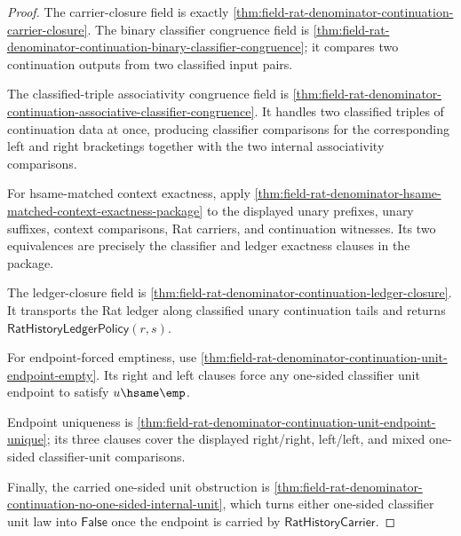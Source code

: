 \begin{proof}
The carrier-closure field is exactly
\autoref{thm:field-rat-denominator-continuation-carrier-closure}. The binary
classifier congruence field is
\autoref{thm:field-rat-denominator-continuation-binary-classifier-congruence};
it compares two continuation outputs from two classified input pairs.

The classified-triple associativity congruence field is
\autoref{thm:field-rat-denominator-continuation-associative-classifier-congruence}.
It handles two classified triples of continuation data at once, producing
classifier comparisons for the corresponding left and right bracketings together
with the two internal associativity comparisons.

For hsame-matched context exactness, apply
\autoref{thm:field-rat-denominator-hsame-matched-context-exactness-package} to
the displayed unary prefixes, unary suffixes, context comparisons, Rat carriers,
and continuation witnesses. Its two equivalences are precisely the classifier
and ledger exactness clauses in the package.

The ledger-closure field is
\autoref{thm:field-rat-denominator-continuation-ledger-closure}. It transports
the Rat ledger along classified unary continuation tails and returns
$\mathsf{RatHistoryLedgerPolicy}(r,s)$.

For endpoint-forced emptiness, use
\autoref{thm:field-rat-denominator-continuation-unit-endpoint-empty}. Its right
and left clauses force any one-sided classifier unit endpoint to satisfy
$u\hsame\emp$.

Endpoint uniqueness is
\autoref{thm:field-rat-denominator-continuation-unit-endpoint-unique}; its three
clauses cover the displayed right/right, left/left, and mixed one-sided
classifier-unit comparisons.

Finally, the carried one-sided unit obstruction is
\autoref{thm:field-rat-denominator-continuation-no-one-sided-internal-unit},
which turns either one-sided classifier unit law into $\mathsf{False}$ once the
endpoint is carried by $\mathsf{RatHistoryCarrier}$.
\end{proof}




